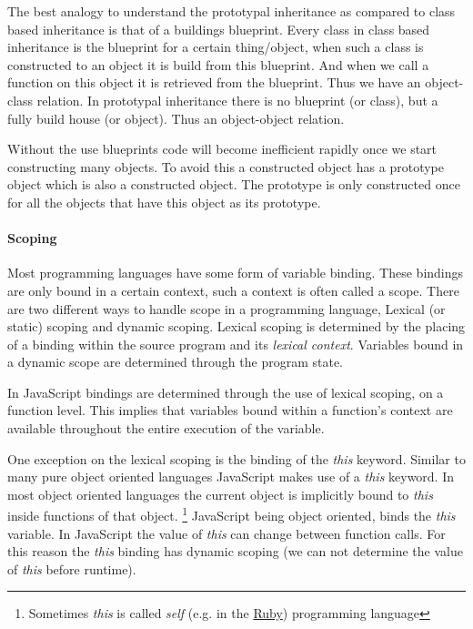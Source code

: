 The best analogy to understand the prototypal inheritance as compared to class based inheritance is that of a buildings blueprint. Every class in class based inheritance is the blueprint for a certain thing/object, when such a class is constructed to an object it is build from this blueprint. And when we call a function on this object it is retrieved from the blueprint. Thus we have an object-class relation. In prototypal inheritance there is no blueprint (or class), but a fully build house (or object). Thus an object-object relation.

Without the use blueprints code will become inefficient rapidly once we start constructing many objects. To avoid this a constructed object has a prototype object which is also a constructed object. The prototype is only constructed once for all the objects that have this object as its prototype.

\paragraph{Scoping} \label{javascript-scoping}
Most programming languages have some form of variable binding. These bindings are only bound in a certain context, such a context is often called a scope. There are two different ways to handle scope in a programming language, Lexical (or static) scoping and dynamic scoping. Lexical scoping is determined by the placing of a binding within the source program and its \textit{lexical context}. Variables bound in a dynamic scope are determined through the program state. 

In JavaScript bindings are determined through the use of lexical scoping, on a function level. This implies that variables bound within a function's context are available throughout the entire execution of the variable. 

One exception on the lexical scoping is the binding of the \textit{this} keyword. Similar to many pure object oriented languages JavaScript makes use of a \textit{this} keyword. In most object oriented languages the current object is implicitly bound to \textit{this} inside functions of that object. \footnote{Sometimes \textit{this} is called \textit{self} (e.g. in the \href{http://ruby.org}{Ruby}) programming language} 
JavaScript being object oriented, binds the \textit{this} variable. In JavaScript the value of \textit{this} can change between function calls. For this reason the \textit{this} binding has dynamic scoping (we can not determine the value of \textit{this} before runtime). 

